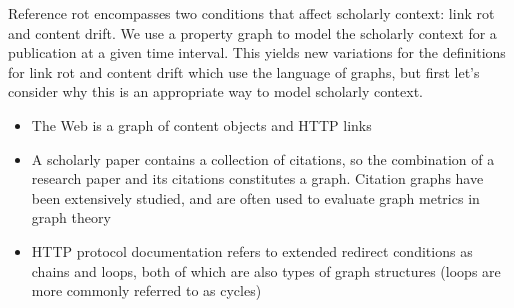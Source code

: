 \documentclass[12pt]{article}
\begin{document}
Reference rot encompasses two conditions that affect scholarly context: link rot and content drift. We use a property graph to model the scholarly context for a publication at a given time interval. This yields new variations for the definitions for link rot and content drift which use the language of graphs, but first let's consider why this is an appropriate way to model scholarly context.
\begin{itemize}
\item{The Web is a graph of content objects and HTTP links}
\item{A scholarly paper contains a collection of citations, so the combination of a research paper and its citations constitutes a graph. Citation graphs have been extensively studied, and are often used to evaluate graph metrics in graph theory}
\item{HTTP protocol documentation refers to extended redirect conditions as chains and loops, both of which are also types of graph structures (loops are more commonly referred to as cycles)}
\end{itemize}
\end{document}
